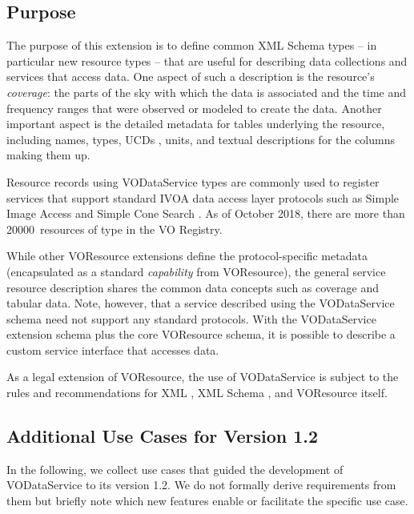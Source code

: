 \documentclass[11pt,a4paper]{ivoa}
\begin{document}
\subsection{Purpose}


The purpose of this extension is to define common XML Schema
types -- in particular new resource types -- that are useful for describing
data collections and services that access data.  One aspect of such a
description is the resource's \emph{coverage}:  the parts of the
sky with which the data is associated and the time and frequency ranges that
were observed or modeled to create the data.  Another important aspect
is the detailed metadata for tables underlying the resource, including
names, types, UCDs
\citep{2023ivoa.spec.0125C}, units,
and textual descriptions for the columns making them up.

Resource records using VODataService types are commonly used to register
services that support standard IVOA data access layer protocols such
as Simple Image Access \citep{2015ivoa.spec.1223D} and Simple Cone Search
\citep{2008ivoa.specQ0222P}.  As of October 2018, there are more than
20000~resources of type  in the VO Registry.

While other VOResource extensions
define the protocol-specific metadata (encapsulated as a standard
\emph{capability} from VOResource), the general service
resource description shares the common data concepts such as
coverage and tabular data.  Note, however, that a service described
using the VODataService schema need not support any standard
protocols.  With the VODataService extension schema plus the core
VOResource schema, it is possible to describe a custom service
interface that accesses data.



As a legal extension of VOResource, the use
of VODataService is subject to the rules and recommendations for XML
\citep{std:XML}, XML Schema \citep{std:XSD},
and VOResource itself.

\subsection{Additional Use Cases for Version 1.2}

In the following, we collect use cases that guided the development of
VODataService to its version 1.2.  We do not formally derive
requirements from them but briefly note which new features enable or
facilitate the specific use case.
\end{document}
